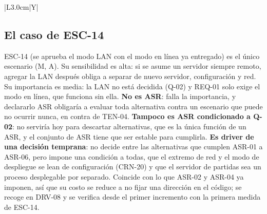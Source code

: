 \begin{tabla}{|L{3.0cm}|Y|}
\fichacab
{}
\end{tabla}

\subsection{El caso de ESC-14}\label{sec:asr:esc14}

ESC-14 (se aprueba el modo LAN con el modo en línea ya entregado) es el único escenario (M, A). Su sensibilidad es alta: si se asume un servidor siempre remoto, agregar la LAN después obliga a separar de nuevo servidor, configuración y red. Su importancia es media: la LAN no está decidida (Q-02) y REQ-01 solo exige el modo en línea, que funciona sin ella. \textbf{No es ASR}: falla la importancia, y declararlo ASR obligaría a evaluar toda alternativa contra un escenario que puede no ocurrir nunca, en contra de TEN-04. \textbf{Tampoco es ASR condicionado a Q-02}: no serviría hoy para descartar alternativas, que es la única función de un ASR, y el conjunto de ASR tiene que ser estable para cumplirla. \textbf{Es driver de una decisión temprana}: no decide entre las alternativas que cumplen ASR-01 a ASR-06, pero impone una condición a todas, que el extremo de red y el modo de despliegue se lean de configuración (CRN-20) y que el servidor de partidas sea un proceso desplegable por separado. Coincide con lo que ASR-02 y ASR-04 ya imponen, así que su costo se reduce a no fijar una dirección en el código; se recoge en DRV-08 y se verifica desde el primer incremento con la primera medida de ESC-14.

